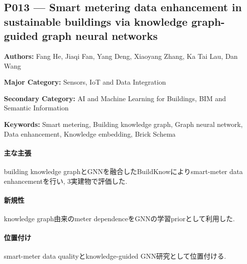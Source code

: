 \subsection{P013 --- Smart metering data enhancement in sustainable buildings via knowledge graph-guided graph neural networks}
\label{paper:P013}
\textbf{Authors:} Fang He, Jiaqi Fan, Yang Deng, Xiaoyang Zhang, Ka Tai Lau, Dan Wang\par
\textbf{Major Category:} Sensors, IoT and Data Integration\par
\textbf{Secondary Category:} AI and Machine Learning for Buildings, BIM and Semantic Information\par
\textbf{Keywords:} Smart metering, Building knowledge graph, Graph neural network, Data enhancement, Knowledge embedding, Brick Schema\par
\paragraph{主な主張}
building knowledge graphとGNNを融合したBuildKnowによりsmart-meter data enhancementを行い, 3実建物で評価した. \cite{He:2025BuildKnow}
\paragraph{新規性}
knowledge graph由来のmeter dependenceをGNNの学習priorとして利用した.
\paragraph{位置付け}
smart-meter data qualityとknowledge-guided GNN研究として位置付ける.
